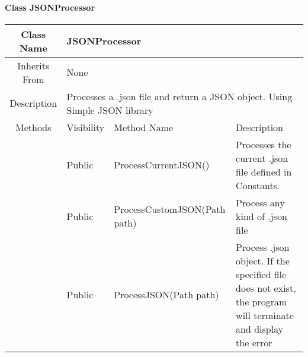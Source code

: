 \paragraph{Class JSONProcessor}\mbox{}
\begin{tabularx}{\textwidth}{|c||l|l|l|X|}
    \hline
    \cellcolor{lightgray}Class Name & \multicolumn{4}{X|}{JSONProcessor}\\
    \hline
    \cellcolor{lightgray}Inherits From & \multicolumn{4}{X|}{None}\\
    \hline
    \cellcolor{lightgray}Description & \multicolumn{4}{p{12cm}|}{Processes a .json file and return a JSON object. Using Simple JSON library}\\
    \hline\hline
    
    \cellcolor{lightgray}Methods & \cellcolor{lightgray}Visibility & \multicolumn{2}{l|}{\cellcolor{lightgray}Method Name} & \cellcolor{lightgray}Description\\\cline{2-5}
    \hline
    \cellcolor{lightgray} & Public & \multicolumn{2}{l|}{ProcessCurrentJSON()} & Processes the current .json file defined in Constants.\\
    \hline
    \cellcolor{lightgray} & Public & \multicolumn{2}{l|}{ProcessCustomJSON(Path path)} & Process any kind of .json file\\
    \hline
    \cellcolor{lightgray} & Public & \multicolumn{2}{l|}{ProcessJSON(Path path)} & Process .json object. If the specified file does not exist, the program will terminate and display the error\\
    \hline
\end{tabularx}